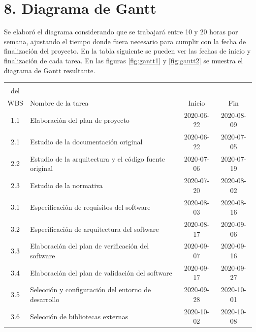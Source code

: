 \documentclass[11pt]{charter}
\begin{document}
\newpage

\section{8. Diagrama de Gantt}
\label{sec:gantt}

Se elaboró el diagrama considerando que se trabajará entre 10 y 20 horas por semana, ajustando el tiempo
donde fuera necesario para cumplir con la fecha de finalización del proyecto. En la tabla siguiente se pueden ver las fechas de
inicio y finalización de cada tarea. En las figuras \ref{fig:gantt1} y \ref{fig:gantt2} se muestra el diagrama de Gantt resultante.

\begin{table}[htpb]
  \centering
  \begin{tabularx}{\linewidth}{@{}|c|X|c|c|@{}}
  \hline
  \rowcolor[HTML]{C0C0C0} 
  \cellcolor[HTML]{C0C0C0}\begin{tabular}[c]{@{}c@{}}Tarea\\del\\WBS\end{tabular}  & Nombre de la tarea                                       & Inicio     & Fin        \\ \hline
  1.1  & Elaboración del plan de proyecto                         & 2020-06-22 & 2020-08-09 \\ \hline
  2.1  & Estudio de la documentación original                     & 2020-06-22 & 2020-07-05 \\ \hline
  2.2  & Estudio de la arquitectura y el código fuente original   & 2020-07-06 & 2020-07-19 \\ \hline
  2.3  & Estudio de la normativa                                  & 2020-07-20 & 2020-08-02 \\ \hline
  3.1  & Especificación de requisitos del software                & 2020-08-03 & 2020-08-16 \\ \hline
  3.2  & Especificación de arquitectura del software              & 2020-08-17 & 2020-09-06 \\ \hline
  3.3  & Elaboración del plan de verificación del software        & 2020-09-07 & 2020-09-16 \\ \hline
  3.4  & Elaboración del plan de validación del software          & 2020-09-17 & 2020-09-27 \\ \hline
  3.5  & Selección y configuración del entorno de desarrollo      & 2020-09-28 & 2020-10-01 \\ \hline
  3.6  & Selección de bibliotecas externas                          & 2020-10-02 & 2020-10-08 \\ \hline

\end{tabularx}
\end{table}
\end{document}
